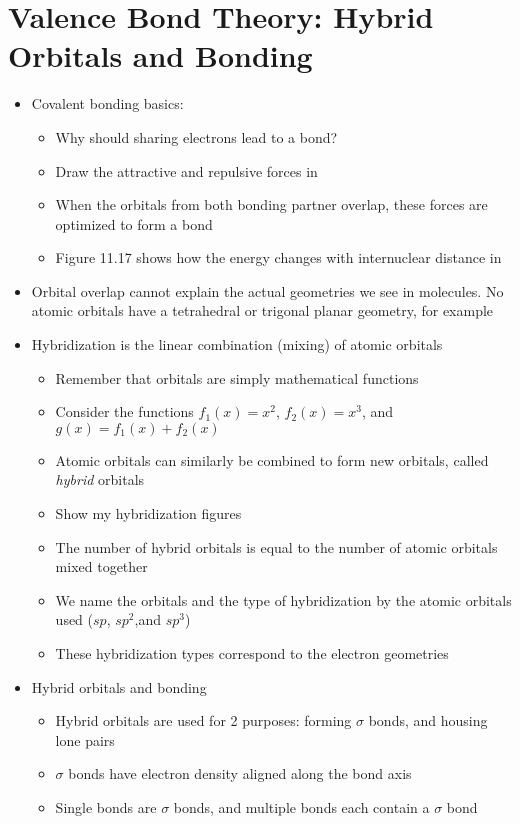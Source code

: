 \documentclass[12pt, openany, letterpaper]{memoir}
\begin{document}
\section{Valence Bond Theory: Hybrid Orbitals and Bonding}
\begin{itemize}
	\item Covalent bonding basics:
	\begin{itemize}
		\item Why should sharing electrons lead to a bond?
		\item Draw the attractive and repulsive forces in 
		\item When the orbitals from both bonding partner overlap, these forces are optimized to form a bond
		\item Figure 11.17 shows how the energy changes with internuclear distance in 
	\end{itemize}
	\item Orbital overlap cannot explain the actual geometries we see in molecules. No atomic orbitals have a tetrahedral or trigonal planar geometry, for example
	\item Hybridization is the linear combination (mixing) of atomic orbitals
	\begin{itemize}
		\item Remember that orbitals are simply mathematical functions
		\item Consider the functions $f_1(x) = x^2$, $f_2(x) = x^3$, and $g(x) = f_1(x) + f_2(x)$
		\item Atomic orbitals can similarly be combined to form new orbitals, called \emph{hybrid} orbitals
		\item Show my hybridization figures
		\item The number of hybrid orbitals is equal to the number of atomic orbitals mixed together
		\item We name the orbitals and the type of hybridization by the atomic orbitals used ($sp$, $sp^2$,and $sp^3$)
		\item These hybridization types correspond to the electron geometries
	\end{itemize}
	\item Hybrid orbitals and bonding
	\begin{itemize}
		\item Hybrid orbitals are used for 2 purposes: forming $\sigma$ bonds, and housing lone pairs
		\item $\sigma$ bonds have electron density aligned along the bond axis
		\item Single bonds are $\sigma$ bonds, and multiple bonds each contain a $\sigma$ bond

\end{itemize}
\end{itemize}
\end{document}
